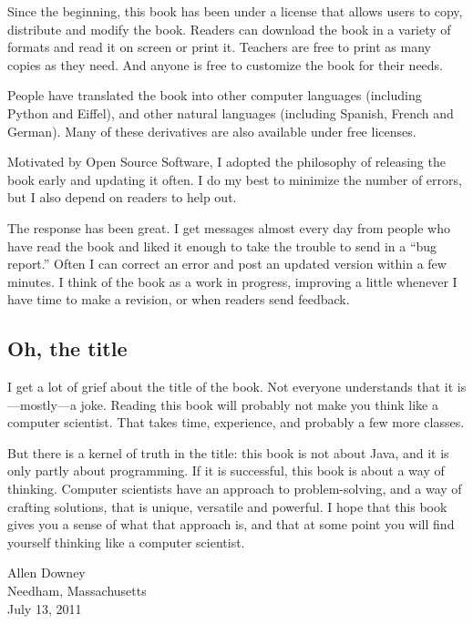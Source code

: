 Since the beginning, this book has been under a license that allows users
to copy, distribute and modify the book.  Readers can download the
book in a variety of formats and read it on screen or print it.
Teachers are free to print as many copies as they need.  And anyone is
free to customize the book for their needs.

People have translated the book into other computer languages
(including Python and Eiffel), and other natural languages (including
Spanish, French and German).  Many of these derivatives are also
available under free licenses.

Motivated by Open
Source Software, I adopted the philosophy of releasing the
book early and updating it often.  I do my best to minimize the
number of errors, but I also depend on readers to help out.

The response has been great.  I get messages almost every day from
people who have read the book and liked it enough to take the trouble
to send in a ``bug report.''  Often I can correct an error
and post an updated version within a few minutes.  I think of the
book as a work in progress, improving a little whenever I have time
to make a revision, or when readers send feedback.

\subsection*{Oh, the title}

I get a lot of grief about the title of the book.  Not everyone
understands that it is---mostly---a joke.
Reading this book will probably not make you think like a computer
scientist.  That takes time, experience, and probably a few more
classes.

But there is a kernel of truth in the title: this book is not
about Java, and it is only partly about programming.  If it is
successful, this book is about a way of thinking.  Computer scientists
have an approach to problem-solving, and a way of crafting solutions,
that is unique, versatile and powerful.  I hope that this book
gives you a sense of what that approach is, and that at some
point you will find yourself thinking like a computer scientist.

\vspace{0.2in}

\begin{flushleft}
Allen Downey\\
Needham, Massachusetts\\
July 13, 2011
\end{flushleft}
